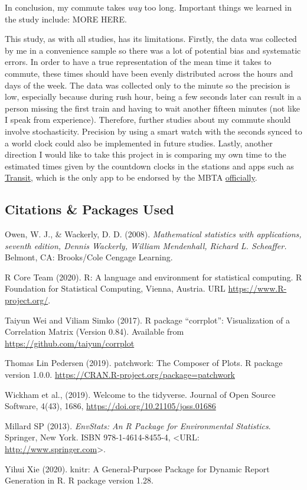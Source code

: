 \documentclass[
]{article}
\begin{document}
In conclusion, my commute takes \emph{way} too long. Important things we
learned in the study include: MORE HERE.

This study, as with all studies, has its limitations. Firstly, the data
was collected by me in a convenience sample so there was a lot of
potential bias and systematic errors. In order to have a true
representation of the mean time it takes to commute, these times should
have been evenly distributed across the hours and days of the week. The
data was collected only to the minute so the precision is low,
especially because during rush hour, being a few seconds later can
result in a person missing the first train and having to wait another
fifteen minutes (not like I speak from experience). Therefore, further
studies about my commute should involve stochasticity. Precision by
using a smart watch with the seconds synced to a world clock could also
be implemented in future studies. Lastly, another direction I would like
to take this project in is comparing my own time to the estimated times
given by the countdown clocks in the stations and apps such as
\href{https://transitapp.com/}{Transit}, which is the only app to be
endorsed by the MBTA
\href{https://www.wbur.org/bostonomix/2016/09/06/mbta-best-transit-app}{officially}.

\hypertarget{citations-packages-used}{%
\subsection{Citations \& Packages Used}\label{citations-packages-used}}

Owen, W. J., \& Wackerly, D. D. (2008). \emph{Mathematical statistics
with applications, seventh edition, Dennis Wackerly, William Mendenhall,
Richard L. Scheaffer.} Belmont, CA: Brooks/Cole Cengage Learning.

R Core Team (2020). R: A language and environment for statistical
computing. R Foundation for Statistical Computing, Vienna, Austria. URL
\url{https://www.R-project.org/}.

Taiyun Wei and Viliam Simko (2017). R package ``corrplot'':
Visualization of a Correlation Matrix (Version 0.84). Available from
\url{https://github.com/taiyun/corrplot}

Thomas Lin Pedersen (2019). patchwork: The Composer of Plots. R package
version 1.0.0. \url{https://CRAN.R-project.org/package=patchwork}

Wickham et al., (2019). Welcome to the tidyverse. Journal of Open Source
Software, 4(43), 1686, \url{https://doi.org/10.21105/joss.01686}

Millard SP (2013). \emph{EnvStats: An R Package for Environmental
Statistics}. Springer, New York. ISBN 978-1-4614-8455-4, \textless URL:
\url{http://www.springer.com}\textgreater.

Yihui Xie (2020). knitr: A General-Purpose Package for Dynamic Report
Generation in R. R package version 1.28.
\end{document}
